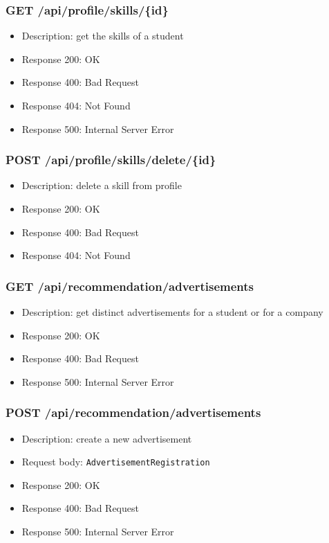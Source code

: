 \subsubsection{GET /api/profile/skills/\{id\}}
\begin{itemize}
    \item Description: get the skills of a student
    \item Response 200: OK
    \item Response 400: Bad Request
    \item Response 404: Not Found
    \item Response 500: Internal Server Error
\end{itemize}

\subsubsection{POST /api/profile/skills/delete/\{id\}}
\begin{itemize}
    \item Description: delete a skill from profile
    \item Response 200: OK
    \item Response 400: Bad Request
    \item Response 404: Not Found
\end{itemize}

\subsubsection{GET /api/recommendation/advertisements}
\begin{itemize}
    \item Description: get distinct advertisements for a student or for a company
    \item Response 200: OK
    \item Response 400: Bad Request
    \item Response 500: Internal Server Error
\end{itemize}

\subsubsection{POST /api/recommendation/advertisements}
\begin{itemize}
    \item Description: create a new advertisement
    \item Request body: \verb|AdvertisementRegistration|
    \item Response 200: OK
    \item Response 400: Bad Request
    \item Response 500: Internal Server Error
\end{itemize}

